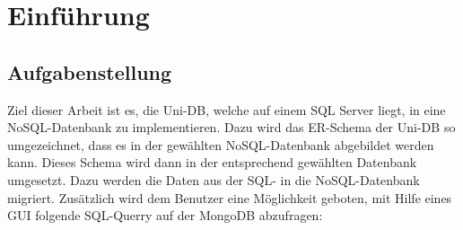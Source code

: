 \section{Einführung}

\subsection{Aufgabenstellung}
Ziel dieser Arbeit ist es, die Uni-DB, welche auf einem SQL Server liegt, in eine NoSQL-Datenbank zu implementieren. Dazu wird das ER-Schema der Uni-DB so umgezeichnet, dass es in der gewählten NoSQL-Datenbank abgebildet werden kann. Dieses Schema wird dann in der entsprechend gewählten Datenbank umgesetzt. Dazu werden die Daten aus der SQL- in die NoSQL-Datenbank migriert.
Zusätzlich wird dem Benutzer eine Möglichkeit geboten, mit Hilfe eines GUI
folgende SQL-Querry auf der MongoDB\cite{MongoDB2016} abzufragen:




\newpage
